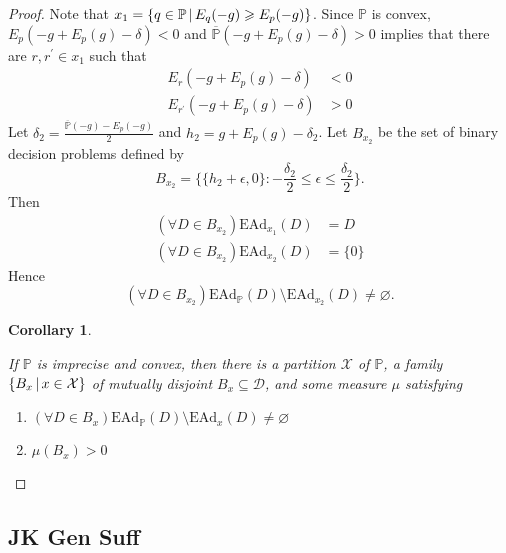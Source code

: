 \documentclass[a4paper]{article}
\newtheorem{corollary}[theorem]{Corollary}
\newcommand\X{\mathcal{X}}
\renewcommand\P{\mathbb{P}} %
\newcommand\EAd{\mathrm{EAd}}
\newcommand{\Decs}{\mathcal{D}}
\newcommand{\IP}{\P}
\newcommand\SetDelimiter[1][]{
	\nonscript\,#1\vert \allowbreak \nonscript\,\mathopen{}}
\providecommand\given{\SetDelimiter}
\renewcommand{\leq}{\leqslant}
\renewcommand{\geq}{\geqslant}
\newenvironment{CCM rewritten}
{\begingroup\color{blue}} %
{\endgroup}              %
\begin{document}
\begin{proof}
Note that $x_1=\left\{q\in\IP\given E_q(-g)\geq E_p(-g)\right\}$. Since $\IP$ is convex, $E_p(-g+E_p(g)-\delta)<0$ and $\overline{\IP}(-g+E_p(g)-\delta)>0$ implies that there are $r,r^\prime\in x_1$ such that 
\begin{align}
E_r(-g+E_p(g)-\delta)&<0\\
E_{r^\prime}(-g+E_p(g)-\delta)&>0
\end{align}
Let $\delta_2=\frac{\overline{\IP}(-g)-E_p(-g)}{2}$ and $h_2=g+E_p(g)-\delta_2$. Let $B_{x_2}$ be the set of binary decision problems defined by
$$
B_{x_2} = \{ \{h_2+\epsilon,0\} : -\frac{\delta_2}{2}\leq\epsilon\leq\frac{\delta_2}{2} \}.
$$
Then
\begin{align}
(\forall D\in B_{x_2})\EAd_{x_1}(D)&=D\\
(\forall D\in B_{x_2})\EAd_{x_2}(D)&=\{0\}
\end{align}
Hence
\[
(\forall D\in B_{x_2})\EAd_\IP(D)\setminus\EAd_{x_2}(D)\not=\varnothing.
\]




\begin{corollary}\label{thm:ead-existsimpermissible[indep]:JK-2-corollary}

If $\IP$ is imprecise and convex, then there is a partition $\X$ of $\IP$, a family $\left\{ B_x \given x\in\X\right\}$ of mutually disjoint $B_x\subseteq\Decs$, and some measure $\mu$ satisfying
\begin{enumerate}
\item $(\forall D\in B_x)\EAd_\IP(D)\setminus\EAd_x(D)\not=\varnothing$
\item $\mu(B_x)>0$
\end{enumerate}

\end{corollary}











\end{proof}






\subsection{JK Gen Suff}
\end{document}
